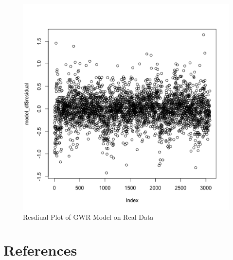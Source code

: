 \documentclass[
]{article}
\begin{document}
\begin{figure}[H]

{\centering \includegraphics{residual_plot.png}

}

\caption{Resdiual Plot of GWR Model on Real Data}

\end{figure}%

\newpage{}

\section{References}\label{references}
\end{document}
